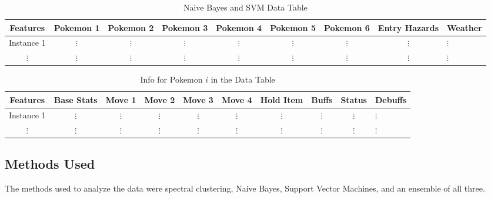 \documentclass{acm_proc_article-sp}
\begin{document}
\begin{table*}

\centering

\caption{Naive Bayes and SVM Data Table}

\begin{tabular}{|c|c|c|c|c|c|c|c|l|} \hline

Features & Pokemon 1 & Pokemon 2 & Pokemon 3 & Pokemon 4 & Pokemon 5 & Pokemon 6 & Entry Hazards & Weather \\ \hline

Instance 1 & $\vdots$ & $\vdots$ & $\vdots$ & $\vdots$ & $\vdots$ & $\vdots$ & $\vdots$ & $\vdots$ \\ \hline

$\vdots$ & $\vdots$ & $\vdots$ & $\vdots$ & $\vdots$ & $\vdots$ & $\vdots$ & $\vdots$ & $\vdots$ \\ \hline

\end{tabular}

\end{table*}

\begin{table*}

\centering

\caption{Info for Pokemon $i$ in the Data Table}

\begin{tabular}{|c|c|c|c|c|c|c|c|c|l|} \hline

Features & Base Stats & Move 1 & Move 2 & Move 3 & Move 4 & Hold Item & Buffs & Status & Debuffs \\ \hline

Instance 1 & $\vdots$ & $\vdots$ & $\vdots$ & $\vdots$ & $\vdots$ & $\vdots$ & $\vdots$ & $\vdots$ & $\vdots$ \\ \hline

$\vdots$ & $\vdots$ & $\vdots$ & $\vdots$ & $\vdots$ & $\vdots$ & $\vdots$ & $\vdots$ & $\vdots$ & $\vdots$ \\ \hline

\end{tabular}

\end{table*}

\subsection{Methods Used}
The methods used to analyze the data were spectral clustering, Naive Bayes, Support Vector Machines, and an ensemble of all three.
\end{document}
